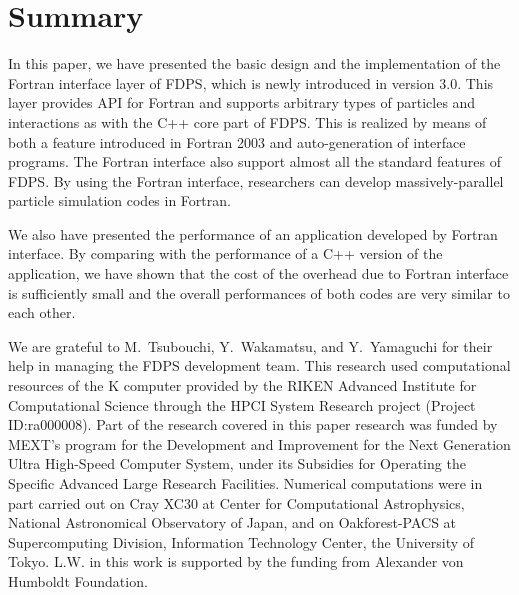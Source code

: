 \documentclass[twocolumn,useamsfonts]{pasj01}
\begin{document}
\section{Summary}
\label{sec:summary}
In this paper, we have presented the basic design and the implementation of the  Fortran interface layer of FDPS, which is newly introduced in version 3.0. This layer provides API for Fortran and supports arbitrary types of particles and interactions as with the C++ core part of FDPS. This is realized by means of both a feature introduced in Fortran 2003 and auto-generation of interface programs. The Fortran interface also support almost all the standard features of FDPS. By using the Fortran interface, researchers can develop massively-parallel particle simulation codes in Fortran.

We also have presented the performance of an application developed by Fortran interface. By comparing with the performance of a C++ version of the application, we have shown that the cost of the overhead due to Fortran interface is sufficiently small and the overall performances of both codes are very similar to each other.  


\bigskip
We are grateful to M.~Tsubouchi, Y.~Wakamatsu, and Y.~Yamaguchi for their help in managing the FDPS development team. This research used computational resources of the K computer provided by the RIKEN Advanced Institute for Computational Science through the HPCI System Research project (Project ID:ra000008). Part of the research covered in this paper research was funded by MEXT’s program for the Development and Improvement for the Next Generation Ultra High-Speed Computer System, under its Subsidies for Operating the Specific Advanced Large Research Facilities. Numerical computations were in part carried out on Cray XC30 at Center for Computational Astrophysics, National Astronomical Observatory of Japan, and on Oakforest-PACS at Supercomputing Division, Information Technology Center, the University of Tokyo. L.W. in this work is supported by the funding from Alexander von Humboldt Foundation.
\end{document}
